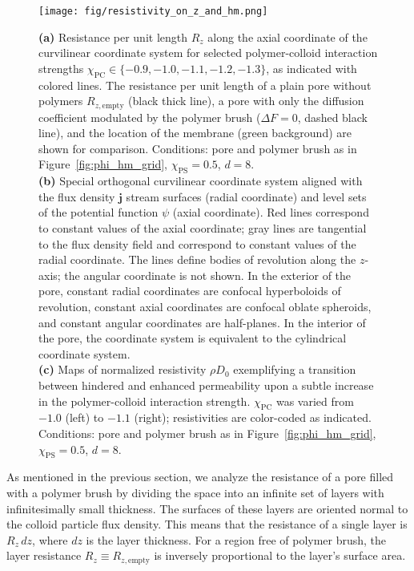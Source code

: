 \documentclass[12pt, a4paper]{article}
\begin{document}
\begin{figure}
    \centering
    \texttt{[image: fig/resistivity\_on\_z\_and\_hm.png]}
    \caption{
    \textbf{(a)} Resistance per unit length $R_{z}$ along the axial coordinate of the curvilinear coordinate system for selected polymer-colloid interaction strengths $\chi_{\textrm{PC}} \in \{ -0.9, -1.0, -1.1, -1.2, -1.3\}$, as indicated with colored lines.
    The resistance per unit length of a plain pore without polymers $R_{z, \textrm{empty}}$ (black thick line), a pore with only the diffusion coefficient modulated by the polymer brush ($\Delta F = 0$, dashed black line), and the location of the membrane (green background) are shown for comparison. 
    Conditions: pore and polymer brush as in Figure~\ref{fig:phi_hm_grid}, $\chi_{\textrm{PS}}=0.5$, $d=8$.
    \\
    \textbf{(b)} Special orthogonal curvilinear coordinate system aligned with the flux density $\bm{j}$ stream surfaces (radial coordinate) and level sets of the potential function $\psi$ (axial coordinate).
    Red lines correspond to constant values of the axial coordinate; gray lines are tangential to the flux density field and correspond to constant values of the radial coordinate.
    The lines define bodies of revolution along the $z$-axis; the angular coordinate is not shown.
    In the exterior of the pore, constant radial coordinates are confocal hyperboloids of revolution, constant axial coordinates are confocal oblate spheroids, and constant angular coordinates are half-planes.
    In the interior of the pore, the coordinate system is equivalent to the cylindrical coordinate system.
    \\
    \textbf{(c)} Maps of normalized resistivity $\rho D_0$ exemplifying a transition between hindered and enhanced permeability upon a subtle increase in the polymer-colloid interaction strength.
    $\chi_{\textrm{PC}}$ was varied from $-1.0$ (left) to $-1.1$ (right); resistivities are color-coded as indicated. 
    Conditions: pore and polymer brush as in Figure~\ref{fig:phi_hm_grid}, $\chi_{\textrm{PS}}=0.5$, $d=8$.
    }
    \label{fig:R_map}
\end{figure}

As mentioned in the previous section, we analyze the resistance of a pore filled with a polymer brush by dividing the space into an infinite set of layers with infinitesimally small thickness.
The surfaces of these layers are oriented normal to the colloid particle flux density.
This means that the resistance of a single layer is $R_z \, dz$, where $dz$ is the layer thickness.
For a region free of polymer brush, the layer resistance $R_z \equiv R_{z, \text{empty}}$ is inversely proportional to the layer's surface area.
\end{document}

